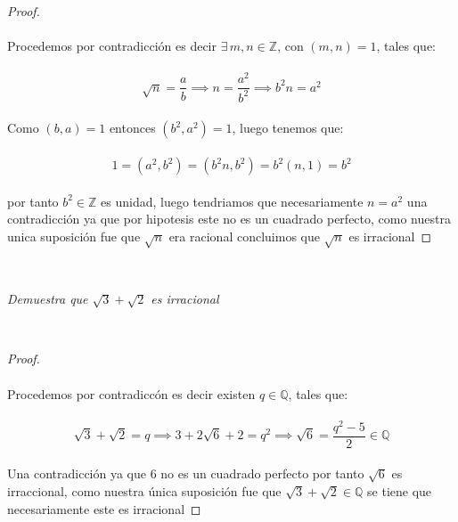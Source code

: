 \documentclass[11pt,letterpaper]{article}
\newcommand{\Z}{\mathbb{Z}}
\newcommand{\Q}{\mathbb{Q}}
\begin{document}
\begin{proof}\,\\
    \,\\
    Procedemos por contradicci\'on es decir $\exists\,m,n\in \Z$, con $(m,n)=1$, tales que:\,\\
    \,\\
    \begin{equation*}
        \sqrt{n}=\frac{a}{b} \implies n=\frac{a^2}{b^2}\implies b^2n=a^2
    \end{equation*}\,\\
    Como $(b,a)=1$ entonces $(b^2,a^2)=1$, luego tenemos que:\,\\
    \,\\
    \begin{equation*}
        1=(a^2,b^2)=(b^2n,b^2)=b^2(n,1)=b^2
    \end{equation*}\,\\
    por tanto $b^2\in\Z$ es unidad, luego tendriamos que necesariamente $n=a^2$ una contradicci\'on
    ya que por hipotesis este no es un cuadrado perfecto, como nuestra unica suposici\'on fue que $\sqrt{n}$
    era racional concluimos que $\sqrt{n}$ es irracional
\end{proof}\,\\
\begin{tcolorbox}[
	title = \textcolor{black}{\textcolor{white}{Problema 12}},]
\textit{
Demuestra que $\sqrt{3}+\sqrt{2}$ es irracional
}
\end{tcolorbox}\,\\
\begin{proof}\,\\
    \,\\
    Procedemos por contradicc\'on es decir existen $q\in \Q$, tales que:\,\\
    \,\\
    \begin{equation*}
        \sqrt{3}+\sqrt{2}=q\implies 3+2\sqrt{6}+2=q^2\implies\sqrt{6}=\frac{q^2-5}{2}\in \Q
    \end{equation*}\,\\
    Una contradicci\'on ya que $6$ no es un cuadrado perfecto por tanto $\sqrt{6}$ es irraccional, como nuestra \'unica suposici\'on fue que 
    $\sqrt{3}+\sqrt{2}\in \Q$ se tiene que necesariamente este es irracional
    
\end{proof}
\,\\
\end{document}
